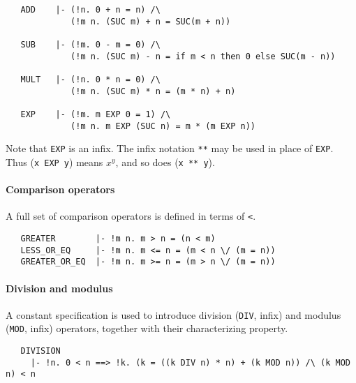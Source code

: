 \begin{hol}
{\small
\begin{verbatim}
   ADD    |- (!n. 0 + n = n) /\
             (!m n. (SUC m) + n = SUC(m + n))

   SUB    |- (!m. 0 - m = 0) /\
             (!m n. (SUC m) - n = if m < n then 0 else SUC(m - n))

   MULT   |- (!n. 0 * n = 0) /\
             (!m n. (SUC m) * n = (m * n) + n)

   EXP    |- (!m. m EXP 0 = 1) /\
             (!m n. m EXP (SUC n) = m * (m EXP n))
\end{verbatim}}
\end{hol}
%
Note that {\small\verb+EXP+} is an infix. The infix notation
{\verb+**+} may be used in place of {\small\verb+EXP+}. Thus
({\small\verb+x EXP y+}) means $x^y$, and so does ({\verb+x ** y+}).

\paragraph{Comparison operators}

A full set of comparison operators is defined in terms of \verb+<+.

\begin{hol}
{\small
\begin{verbatim}
   GREATER        |- !m n. m > n = (n < m)
   LESS_OR_EQ     |- !m n. m <= n = (m < n \/ (m = n))
   GREATER_OR_EQ  |- !m n. m >= n = (m > n \/ (m = n))
\end{verbatim}}
\end{hol}

\paragraph{Division and modulus}

A constant specification is used to introduce division ({\small\verb+DIV+}, infix) and
modulus ({\small\verb+MOD+}, infix) operators, together with their
characterizing property.
\begin{hol}
\index{MOD@\ml{MOD}}
\index{DIV@\ml{DIV}}
{\small
\begin{verbatim}
   DIVISION
     |- !n. 0 < n ==> !k. (k = ((k DIV n) * n) + (k MOD n)) /\ (k MOD n) < n
\end{verbatim}}
\end{hol}

